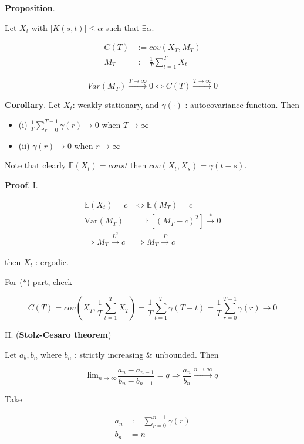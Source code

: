 \documentclass[12pt]{article}
\theoremstyle{nonumberbreak}
\begin{document}
\begin{theorem}
\textbf{Proposition}. 

Let $X_t$ with $|K(s,t)| \le \alpha $ such that $\exists \alpha$. 

$$
\begin{aligned}
C(T) &:= cov(X_T, M_T) \\[8pt]
M_T &:= \frac{1}{T} \sum_{t=1}^T X_t
\end{aligned}
$$

$$
Var(M_T) \overset{T \to \infty}{\to} 0 \Leftrightarrow C(T) \overset{T \to \infty}{\to} 0
$$

\textbf{Corollary}. Let $X_t$: weakly stationary, and $\gamma(\cdot)$ : autocovariance function. Then

\begin{itemize}
	\item (i) $\frac{1}{T} \sum_{r=0}^{T-1} \gamma(r) \to 0$ when $T \to \infty$
	\item (ii) $\gamma(r) \to 0 $ when $r \to \infty$
\end{itemize}

\end{theorem}

Note that clearly $\mathbb{E} (X_t) = const$ then $cov(X_t, X_s) = \gamma(t-s)$. 


\textbf{Proof}. I.

$$
\begin{aligned}
\mathbb{E}(X_t) = c &\Leftrightarrow \mathbb{E}(M_T) = c \\[8pt]
\mathrm{Var}(M_T) &= \mathbb{E} \left[ (M_T - c)^2 \right] \overset{\ast}{\to} 0 \\[8pt]
\Rightarrow M_T \overset{L^2}{\to} c &\Rightarrow M_T \overset{P}{\to} c
\end{aligned}
$$

then $X_t$ : ergodic. 

For ($\ast$) part, check 

$$
C(T) = cov(X_T, \frac{1}{T} \sum_{t=1}^T X_T) = \frac{1}{T} \sum_{t=1}^T \gamma(T-t) = \frac{1}{T} \sum_{r=0}^{T-1} \gamma(r) \to 0
$$


II. (\textbf{Stolz-Cesaro theorem})

Let $a_b, b_n$ where $b_n$ : strictly increasing \& unbounded. Then

$$
\mathrm{lim}_{n \to \infty} \frac{a_n - a_{n-1}}{b_n - b_{n-1}} = q \Rightarrow \frac{a_n}{b_n} \overset{n\to\infty}{\to} q
$$

Take

$$
\begin{aligned}
a_n &:= \sum_{r=0}^{n-1} \gamma(r)\\[8pt]
b_n &= n
\end{aligned}
$$
\end{document}
